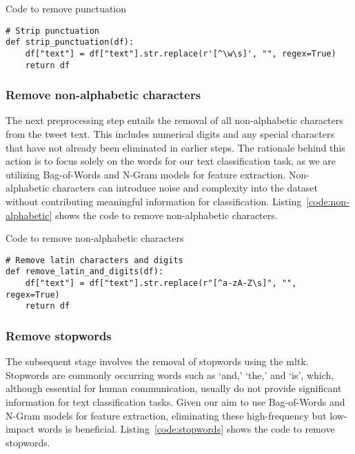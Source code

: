\documentclass{article}
\begin{document}
\begin{listing}[H]
\caption{Code to remove punctuation}
\label{code:punctuation}
\begin{verbatim}
# Strip punctuation
def strip_punctuation(df):
    df["text"] = df["text"].str.replace(r'[^\w\s]', "", regex=True)
    return df
\end{verbatim}
\end{listing}


\subsubsection{Remove non-alphabetic characters}

The next preprocessing step entails the removal of all non-alphabetic characters from the tweet text. This includes numerical digits and any special characters that have not already been eliminated in earlier steps. The rationale behind this action is to focus solely on the words for our text classification task, as we are utilizing Bag-of-Words and N-Gram models for feature extraction. Non-alphabetic characters can introduce noise and complexity into the dataset without contributing meaningful information for classification. Listing~\ref{code:non-alphabetic} shows the code to remove non-alphabetic characters.

\begin{listing}[H]
\caption{Code to remove non-alphabetic characters}
\label{code:non-alphabetic}
\begin{verbatim}
# Remove latin characters and digits
def remove_latin_and_digits(df):
    df["text"] = df["text"].str.replace(r"[^a-zA-Z\s]", "", regex=True)
    return df
\end{verbatim}
\end{listing}


\subsubsection{Remove stopwords}

The subsequent stage involves the removal of stopwords using the mltk. Stopwords are commonly occurring words such as ‘and,' ‘the,' and ‘is', which, although essential for human communication, usually do not provide significant information for text classification tasks. Given our aim to use Bag-of-Words and N-Gram models for feature extraction, eliminating these high-frequency but low-impact words is beneficial. Listing~\ref{code:stopwords} shows the code to remove stopwords.
\end{document}
